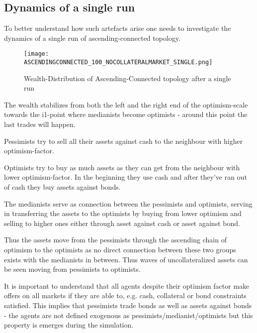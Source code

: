 \documentclass[Bachelorarbeit.tex]{subfiles}
\begin{document}
\subsection{Dynamics of a single run}
To better understand how such artefacts arise one needs to investigate the dynamics of a single run of ascending-connected topology.

\begin{figure}[H]
	\centering
  \texttt{[image: ASCENDINGCONNECTED\_100\_NOCOLLATERALMARKET\_SINGLE.png]}
	\caption{Wealth-Distribution of Ascending-Connected topology after a single run}
	\label{fig:wealth_ASCENDINGCONNECTED_IS_100_NOCOLLATERALMARKET_SINGLE}
\end{figure}

\medskip 

The wealth stabilizes from both the left and the right end of the optimism-scale towards the i1-point where medianists become optimists - around this point the last trades will happen.

\medskip 

Pessimists try to sell all their assets against cash to the neighbour with higher optimism-factor.

\medskip 

Optimists try to buy as much assets as they can get from the neighbour with lower optimism-factor. In the beginning they use cash and after they've ran out of cash they buy assets against bonds.

\medskip 

The medianists serve as connection between the pessimists and optimists, serving in transferring the assets to the optimists by buying from lower optimism and selling to higher ones either through asset against cash or asset against bond.

\medskip 

Thus the assets move from the pessimists through the ascending chain of optimism to the optimists as no direct connection between these two groups exists with the medianists in between. Thus waves of uncollateralized assets can be seen moving from pessimists to optimists.

\medskip 

It is important to understand that all agents despite their optimism factor make offers on all markets if they are able to, e.g. cash, collateral or bond constraints satisfied. This implies that pessimists trade bonds as well as assets against bonds - the agents are not defined exogenous as pessimists/medianist/optimists but this property is emerges during the simulation.
\end{document}
